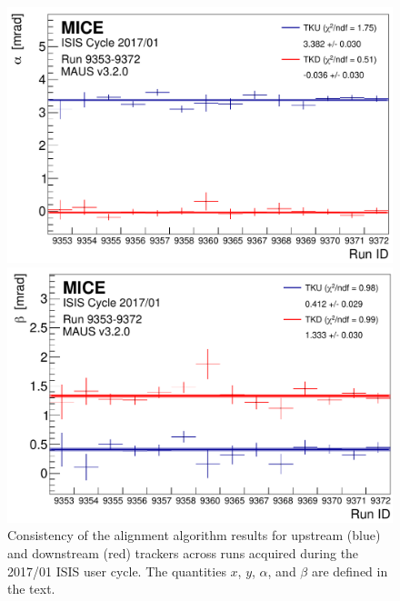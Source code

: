 \begin{figure}[htb]
\begin{center}
\begin{minipage}[b]{.45\textwidth}
\begin{center}
        \includegraphics[width=\textwidth]{data_final/alpha_bestfit_edit.pdf}
      \end{center}
    \end{minipage}
    \hfill
    \begin{minipage}[b]{.45\textwidth}
      \begin{center}
        \includegraphics[width=\textwidth]{data_final/beta_bestfit_edit.pdf}
      \end{center}
    \end{minipage}
  \end{center}
  \caption{
    Consistency of the alignment algorithm results for upstream (blue) and downstream (red) trackers  across runs acquired during
    the 2017/01 ISIS user cycle. The quantities $x$, $y$, $\alpha$, and $\beta$ are defined in the text.
  }
  \label{fig:runtorun}
\end{figure}
